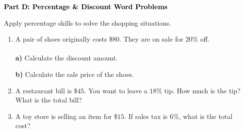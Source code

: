 \documentclass[12pt, letterpaper, fleqn]{article}
\newcommand{\blanklong}{\underline{\hspace{6.5cm}}}
\begin{document}
\newpage

\begin{tcolorbox}[colback=black!10]
    \large\textcolor{black}{\textbf{Part D: Percentage \& Discount Word Problems}}
\end{tcolorbox}

\vspace{3mm}

\noindent
Apply percentage skills to solve the shopping situations.

\vspace{5mm}

\begin{enumerate}[itemsep=3cm, leftmargin=0.6cm]
\item A pair of shoes originally costs $\$80$. They are on sale for $20\%$ off. \\ \\
\textbf{a)} Calculate the discount amount. \blanklong \\ 
\vspace{1.5cm}

\textbf{b)} Calculate the sale price of the shoes. \blanklong

\item A restaurant bill is $\$45$. You want to leave a $18\%$ tip. How much is the tip? What is the total bill?
\vspace{1cm}

\item A toy store is selling an item for $\$15$. If sales tax is $6\%$, what is the total cost?
\end{enumerate}
\end{document}
